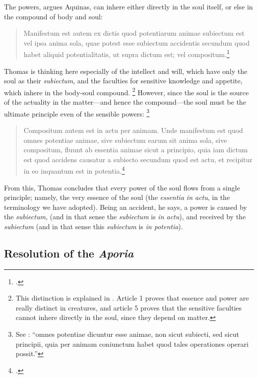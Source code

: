 The powers, argues Aquinas, can inhere either directly in the soul itself, or else in the compound of body and soul:
%
\begin{quotation}
Manifestum est autem ex dictis quod potentiarum animae subiectum est vel ipsa anima sola, quae potest esse subiectum accidentis secundum quod habet aliquid potentialitatis, ut supra dictum est; vel compositum.\footcite[I, q.~77, a.~6, co.]{st:summa}
\end{quotation}
%
Thomas is thinking here especially of the intellect and will, which have only the soul as their \emph{subiectum}, and the faculties for sensitive knowledge and appetite, which inhere in the body-soul compound.%
%
\footnote{This distinction is explained in \cite[I, q.~77, a.~1 and 5]{st:summa}. Article 1 proves that essence and power are really distinct in creatures, and article 5 proves that the sensitive faculties cannot inhere directly in the soul, since they depend on matter.} However, since the soul is the source of the actuality in the matter---and hence the compound---the soul must be the  ultimate principle even of the sensible powers:%
%
\footnote{See \cite[I, q.~77, a.~5, ad~1]{st:summa}: ``omnes potentiae dicuntur esse animae, non sicut subiecti, sed sicut principii, quia per animam coniunctum habet quod tales operationes operari possit.''}
%
\begin{quotation}
Compositum autem est in actu per animam. Unde manifestum est quod omnes potentiae animae, sive subiectum earum sit anima sola, sive compositum, fluunt ab essentia animae sicut a principio, quia iam dictum est quod accidens causatur a subiecto secundum quod est actu, et recipitur in eo inquantum est in potentia.\footcite[I, q.~77, a.~6, co.]{st:summa}
\end{quotation}
%
From this, Thomas concludes that every power of the soul flows from a single principle; namely, the very essence of the soul (the \emph{essentia in actu}, in the terminology we have adopted). Being an accident, he says, a power is caused by the \emph{subiectum}, (and in that sense the \emph{subiectum} is \emph{in actu}), and received by the \emph{subiectum} (and in that sense this \emph{subiectum} is \emph{in potentia}).

\subsection{Resolution of the \emph{Aporia}}

